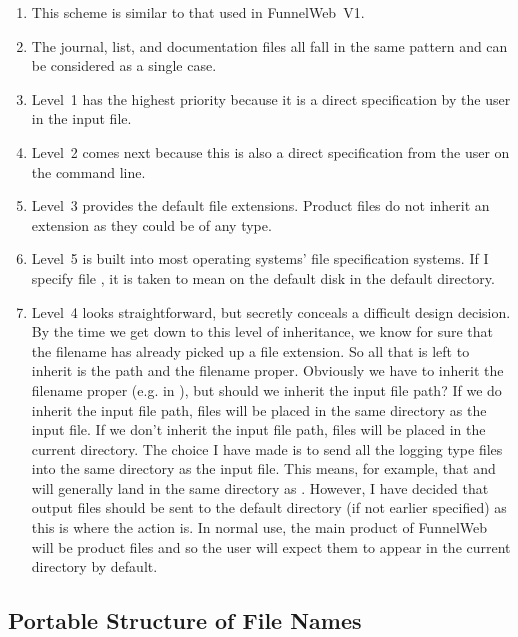 \begin{enumerate}

\item This scheme is similar to that used in FunnelWeb~V1.

\item The journal, list, and documentation
files all fall in the same pattern and
can be considered as a single case.

\item Level~1 has the highest priority because it is a direct specification
by the user in the input file.

\item Level~2 comes next because this is also a direct specification
from the user on the command line.

\item Level~3 provides the default file extensions.
Product files do not inherit an
extension as they could be of any type.

\item Level~5 is built into most operating systems' file specification systems.
If I specify file , it is taken to mean on the default disk in the
default directory.

\item Level~4 looks straightforward, but secretly conceals a difficult design
decision. By the time we get down to this level of inheritance, we know for
sure that the filename has already picked up a file extension. So all that
is left to inherit is the path and the filename proper. Obviously we
have to inherit the filename proper (e.g.  in ), but
should we inherit the input file path? If we do inherit the input file
path, files will be placed in the same directory as the input file. If we
don't inherit the input file path, files will be placed in the current
directory. The choice I have made is to send all the logging type files
into the same directory as the input file. This means, for example,
that  and  will generally land in the same directory
as . However, I have decided that output files should be sent to
the default directory (if not earlier specified) as this is where the
action is. In normal use, the main product of FunnelWeb will be product files
and so the user will expect them to appear in the current directory by
default.

\end{enumerate}

\subsection{Portable Structure of File Names}
\label{portablefilenames}

